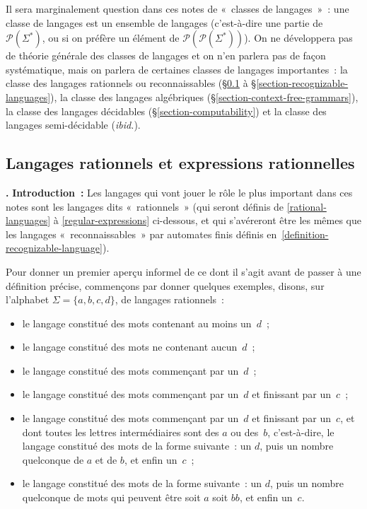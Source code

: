 \documentclass[12pt,a4paper]{article}
\theoremstyle{definition}
\newcommand\thingy{%
\refstepcounter{comcnt}\medskip\noindent\textbf{\thecomcnt.} }
\begin{document}
{\footnotesize Il sera marginalement question dans ces notes de
  « classes de langages » : une classe de langages est un ensemble de
  langages (c'est-à-dire une partie de $\mathscr{P}(\Sigma^*)$, ou si
  on préfère un élément de $\mathscr{P}(\mathscr{P}(\Sigma^*))$).  On
  ne développera pas de théorie générale des classes de langages et on
  n'en parlera pas de façon systématique, mais on parlera de certaines
  classes de langages importantes : la classe des langages rationnels
  ou reconnaissables (§\ref{subsection-rational-languages} à
  §\ref{section-recognizable-languages}), la classe des langages
  algébriques (§\ref{section-context-free-grammars}), la classe des
  langages décidables (§\ref{section-computability}) et la classe des
  langages semi-décidable (\textit{ibid.}).\par}


\subsection{Langages rationnels et expressions rationnelles}\label{subsection-rational-languages}

\thingy \textbf{Introduction :} Les langages qui vont jouer le rôle le
plus important dans ces notes sont les langages dits « rationnels »
(qui seront définis de \ref{rational-languages} à
\ref{regular-expressions} ci-dessous, et qui s'avéreront être les
mêmes que les langages « reconnaissables » par automates finis définis
en \ref{definition-recognizable-language}).

Pour donner un premier aperçu informel de ce dont il s'agit avant de
passer à une définition précise, commençons par donner quelques
exemples, disons, sur l'alphabet $\Sigma = \{a,b,c,d\}$, de langages
rationnels :
\begin{itemize}
\item le langage constitué des mots contenant au moins un $d$ ;
\item le langage constitué des mots ne contenant aucun $d$ ;
\item le langage constitué des mots commençant par un $d$ ;
\item le langage constitué des mots commençant par un $d$ et
  finissant par un $c$ ;
\item le langage constitué des mots commençant par un $d$ et finissant
  par un $c$, et dont toutes les lettres intermédiaires sont des $a$
  ou des $b$, c'est-à-dire, le langage constitué des mots de la forme
  suivante : un $d$, puis un nombre quelconque de $a$ et de $b$, et
  enfin un $c$ ;
\item le langage constitué des mots de la forme suivante : un $d$,
  puis un nombre quelconque de mots qui peuvent être soit $a$ soit
  $bb$, et enfin un $c$.
\end{itemize}
\end{document}
